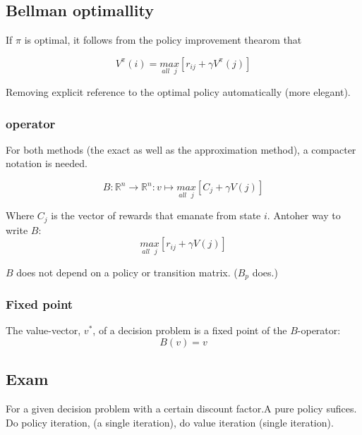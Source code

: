 \documentclass{article}
\begin{document}
\subsection{Bellman optimallity}

If $\pi$ is optimal, it follows from the policy improvement thearom that

\[ V^\pi(i) = \underset{all\mbox{\ }j}{max}[r_{ij} + \gamma V^\pi(j)] \]

Removing explicit reference to the optimal policy automatically (more elegant).

\subsubsection{operator}

For both methods (the exact as well as the approximation method),
a compacter notation is needed.

\[B: \mathbb{R}^n \to \mathbb{R}^n : v \mapsto
	\underset{all\mbox{\ }j}{max}[C_j + \gamma V(j)] \]

Where $C_j$ is the vector of rewards that emanate from state $i$.
Antoher way to write $B:$
\[\underset{all\mbox{\ }j}{max}[r_{ij} + \gamma V(j)] \]

$B$ does not depend on a policy or transition matrix. ($B_p$ does.)

\subsubsection{Fixed point}
The value-vector, $v^*$, of a decision problem is a fixed point of the
$B$-operator:
\[ B(v) = v\]


\subsection{Exam}
 For a given decision problem with a certain
discount factor.A pure policy sufices.
Do policy iteration, (a single iteration), do value iteration
(single iteration).

\end{document}
